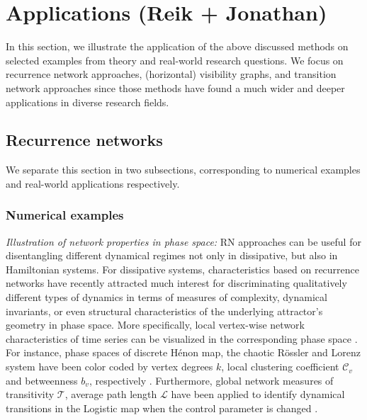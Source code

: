 \section{Applications {\bf{(Reik + Jonathan)}}}\label{sec:Applications}
In this section, we illustrate the application of the above discussed methods on selected examples from theory and real-world research questions. We focus on recurrence network approaches, (horizontal) visibility graphs, and transition network approaches since those methods have found a much wider and deeper applications in diverse research fields. 



	\subsection{Recurrence networks}
	We separate this section in two subsections, corresponding to numerical examples and real-world applications respectively. 	
		\subsubsection{Numerical examples}
		\emph{Illustration of network properties in phase space: } 
		RN approaches can be useful for disentangling different dynamical regimes not only in dissipative, but also in Hamiltonian systems. For dissipative systems, characteristics based on recurrence networks have recently attracted much interest for discriminating qualitatively different types of dynamics in terms of measures of complexity, dynamical invariants, or even structural characteristics of the underlying attractor's geometry in phase space. More specifically, local vertex-wise network characteristics of time series can be visualized in the corresponding phase space \cite{Donner2010a}. For instance, phase spaces of discrete H\'enon map, the chaotic R\"ossler and Lorenz system have been color coded by vertex degrees $k$, local clustering coefficient $\mathcal{C}_v$ and betweenness $b_v$, respectively \cite{Donner2010a}. Furthermore, global network measures of transitivity $\mathcal{T}$, average path length $\mathcal{L}$ have been applied to identify dynamical transitions in the Logistic map when the control parameter is changed \cite{Marwan2009}.   
		
